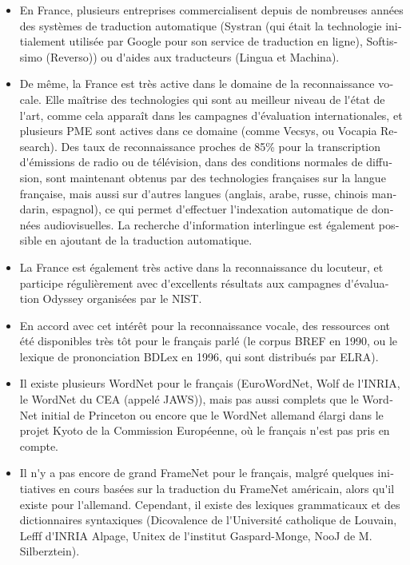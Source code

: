\documentclass[]{../metanetpaper}
\begin{document}
\begin{french}
\begin{multicols}{2}
\begin{itemize}
\item En France, plusieurs entreprises commercialisent depuis de nombreuses
années des systèmes de traduction automatique (Systran (qui était la
technologie initialement utilisée par Google pour son service de
traduction en ligne), Softissimo (Reverso)) ou d{\mbox '}aides aux traducteurs
(Lingua et Machina).

\item De même, la France est très active dans le domaine de la
reconnaissance vocale. Elle maîtrise des technologies qui sont au
meilleur niveau de l{\mbox '}état de l{\mbox '}art, comme cela apparaît dans les
campagnes d{\mbox '}évaluation internationales, et plusieurs PME sont actives
dans ce domaine (comme Vecsys, ou Vocapia Research). Des taux de
reconnaissance proches de 85\% pour la transcription d{\mbox '}émissions de
radio ou de télévision, dans des conditions normales de diffusion,
sont maintenant obtenus par des technologies françaises sur la langue
française, mais aussi sur d{\mbox '}autres langues (anglais, arabe, russe,
chinois mandarin, espagnol), ce qui permet d{\mbox '}effectuer l{\mbox '}indexation automatique
de données audiovisuelles. La recherche d{\mbox '}information interlingue est
également possible en ajoutant de la traduction automatique.

\item La France est également très active dans la reconnaissance du
locuteur, et participe régulièrement avec d{\mbox '}excellents résultats aux
campagnes d{\mbox '}évaluation Odyssey organisées par le NIST.

\item En accord avec cet intérêt pour la reconnaissance vocale, des
ressources ont été disponibles très tôt pour le français parlé (le
corpus BREF en 1990, ou le lexique de prononciation BDLex en 1996, qui
sont distribués par ELRA).

\item Il existe plusieurs WordNet pour le français (EuroWordNet, Wolf
  de l{\mbox '}INRIA, le WordNet du CEA (appelé JAWS)), mais pas aussi
  complets que le WordNet initial de Princeton ou encore que le
  WordNet allemand élargi dans le projet Kyoto de la Commission
  Européenne, où le français n{\mbox '}est pas pris en compte.

\item Il n{\mbox '}y a pas encore de grand FrameNet pour le français, malgré
quelques initiatives en cours basées sur la traduction du FrameNet
américain, alors qu{\mbox '}il existe pour l{\mbox '}allemand. Cependant, il existe
des lexiques grammaticaux et des dictionnaires syntaxiques
(Dicovalence de l{\mbox '}Université catholique de Louvain, Lefff d{\mbox '}INRIA
Alpage, Unitex de l{\mbox '}institut Gaspard-Monge, NooJ de M. Silberztein).


\end{itemize}
\end{multicols}
\end{french}
\end{document}
